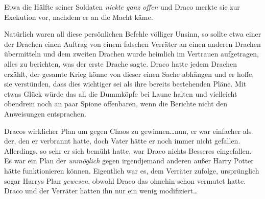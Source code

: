 Etwa die Hälfte seiner Soldaten \emph{nickte ganz offen} und Draco merkte sie zur Exekution vor, nachdem er an die Macht käme.

Natürlich waren all diese persönlichen Befehle völliger Unsinn, so sollte etwa einer der Drachen einen Auftrag von einem falschen Verräter an einen anderen Drachen übermitteln und dem zweiten Drachen wurde heimlich im Vertrauen aufgetragen, alles zu berichten, was der erste Drache sagte. Draco hatte jedem Drachen erzählt, der gesamte Krieg könne von dieser einen Sache abhängen und er hoffe, sie verstünden, dass dies wichtiger sei als ihre bereits bestehenden Pläne. Mit etwas Glück würde das all die Dummköpfe bei Laune halten und vielleicht obendrein noch an paar Spione offenbaren, wenn die Berichte nicht den Anweisungen entsprachen.

Dracos wirklicher Plan um gegen Chaos zu gewinnen…nun, er war einfacher als der, den er verbrannt hatte, doch Vater hätte er noch immer nicht gefallen. Allerdings, so sehr er sich bemüht hatte, war Draco nichts Besseres eingefallen. Es war ein Plan der \emph{unmöglich} gegen irgendjemand anderen außer Harry Potter hätte funktionieren können. Eigentlich war es, dem Verräter zufolge, ursprünglich sogar Harrys Plan \emph{gewesen}, obwohl Draco das ohnehin schon vermutet hatte. Draco und der Verräter hatten ihn nur ein wenig modifiziert…

\later

